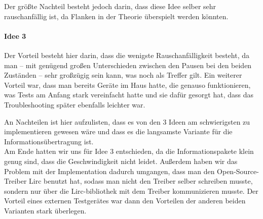 Der größte Nachteil besteht jedoch darin, dass diese Idee selber sehr rauschanfällig ist, da Flanken
in der Theorie überspielt werden könnten.

\paragraph{Idee 3}
Der Vorteil besteht hier darin, dass die wenigste Rauschanfälligkeit besteht, da man – mit genügend
großen Unterschieden zwischen den Pausen bei den beiden Zuständen – sehr großzügig sein kann, was
noch als Treffer gilt.
Ein weiterer Vorteil war, dass man bereits Geräte im Haus hatte, die genauso funktionieren, was
Tests am Anfang stark vereinfacht hatte und sie dafür gesorgt hat, dass das Troubleshooting später
ebenfalls leichter war.

An Nachteilen ist hier aufzulisten, dass es von den 3 Ideen am schwierigsten zu implementieren
gewesen wäre und dass es die langsamste Variante für die Informationsübertragung ist. \\

Am Ende hatten wir uns für Idee 3 entschieden, da die Informationspakete klein genug sind, dass
die Geschwindigkeit nicht leidet.
Außerdem haben wir das Problem mit der Implementation dadurch umgangen, dass man den
Open-Source-Treiber Lirc benutzt hat, sodass man nicht den Treiber selber schreiben musste, sondern
nur über die Lirc-bibliothek mit dem Treiber kommunizieren musste.
Der Vorteil eines externen Testgerätes war dann den Vorteilen der anderen beiden Varianten stark
überlegen.
